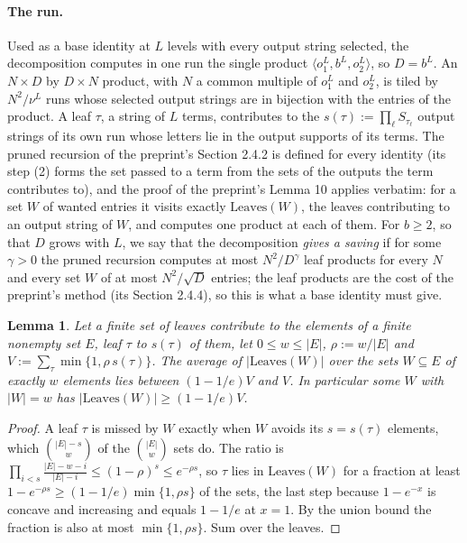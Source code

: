 \documentclass[11pt]{article}
\newtheorem{lemma}[theorem]{Lemma}
\theoremstyle{definition}
\theoremstyle{remark}
\newcommand{\Leaves}{\mathrm{Leaves}}
\begin{document}
\paragraph{The run.} Used as a base identity at $L$ levels with every output string selected, the decomposition computes in one run the single product $\langle o_1^L,b^L,o_2^L\rangle$, so $D=b^L$. An $N\times D$ by $D\times N$ product, with $N$ a common multiple of $o_1^L$ and $o_2^L$, is tiled by $N^2/\nu^L$ runs whose selected output strings are in bijection with the entries of the product. A leaf $\tau$, a string of $L$ terms, contributes to the $s(\tau):=\prod_\ell S_{\tau_\ell}$ output strings of its own run whose letters lie in the output supports of its terms. The pruned recursion of the preprint's Section 2.4.2 is defined for every identity (its step (2) forms the set passed to a term from the sets of the outputs the term contributes to), and the proof of the preprint's Lemma 10 applies verbatim: for a set $W$ of wanted entries it visits exactly $\Leaves(W)$, the leaves contributing to an output string of $W$, and computes one product at each of them. For $b\ge2$, so that $D$ grows with $L$, we say that the decomposition \emph{gives a saving} if for some $\gamma>0$ the pruned recursion computes at most $N^2/D^\gamma$ leaf products for every $N$ and every set $W$ of at most $N^2/\sqrt D$ entries; the leaf products are the cost of the preprint's method (its Section 2.4.4), so this is what a base identity must give.

\begin{lemma}\label{a:lem:link}
Let a finite set of leaves contribute to the elements of a finite nonempty set $E$, leaf $\tau$ to $s(\tau)$ of them, let $0\le w\le|E|$, $\rho:=w/|E|$ and $V:=\sum_\tau\min\{1,\rho\,s(\tau)\}$. The average of $|\Leaves(W)|$ over the sets $W\subseteq E$ of exactly $w$ elements lies between $(1-1/e)V$ and $V$. In particular some $W$ with $|W|=w$ has $|\Leaves(W)|\ge(1-1/e)V$.
\end{lemma}

\begin{proof}
A leaf $\tau$ is missed by $W$ exactly when $W$ avoids its $s=s(\tau)$ elements, which $\binom{|E|-s}w$ of the $\binom{|E|}w$ sets do. The ratio is $\prod_{i<s}\frac{|E|-w-i}{|E|-i}\le(1-\rho)^s\le e^{-\rho s}$, so $\tau$ lies in $\Leaves(W)$ for a fraction at least $1-e^{-\rho s}\ge(1-1/e)\min\{1,\rho s\}$ of the sets, the last step because $1-e^{-x}$ is concave and increasing and equals $1-1/e$ at $x=1$. By the union bound the fraction is also at most $\min\{1,\rho s\}$. Sum over the leaves.
\end{proof}
\end{document}
